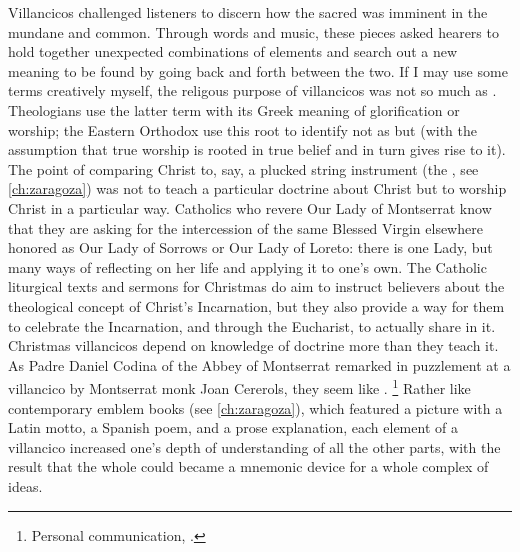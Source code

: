 Villancicos challenged listeners to discern how the sacred was imminent in the
mundane and common.%
Through words and music, these pieces asked hearers to hold together unexpected
combinations of elements and search out a new meaning to be found by going back
and forth between the two.
If I may use some terms creatively myself, the religous purpose of villancicos
was not so much  as .
Theologians use the latter term with its Greek meaning of glorification or
worship; the Eastern Orthodox use this root to identify not as  but  (with the assumption that true worship
is rooted in true belief and in turn gives rise to it).%
The point of comparing Christ to, say, a plucked string instrument (the
, see \cref{ch:zaragoza}) was not to teach a particular
doctrine about Christ but to worship Christ in a particular way.
Catholics who revere Our Lady of Montserrat know that they are asking for the
intercession of the same Blessed Virgin elsewhere honored as Our Lady of
Sorrows or Our Lady of Loreto: there is one Lady, but many ways of reflecting
on her life and applying it to one's own.%
    \citXXX[Johnson?]
The Catholic liturgical texts and sermons for Christmas do aim to instruct
believers about the theological concept of Christ's Incarnation, but they also
provide a way for them to celebrate the Incarnation, and through the Eucharist,
to actually share in it.
Christmas villancicos depend on knowledge of doctrine more than they teach it.
As Padre Daniel Codina of the Abbey of Montserrat remarked in puzzlement at a
villancico by Montserrat monk Joan Cererols, they seem like .%
    \footnote{Personal communication, \XXX[date].}
Rather like contemporary emblem books (see \cref{ch:zaragoza}), which featured
a picture with a Latin motto, a Spanish poem, and a prose explanation, each
element of a villancico increased one's depth of understanding of all the other
parts, with the result that the whole could became a mnemonic device for a
whole complex of ideas.

